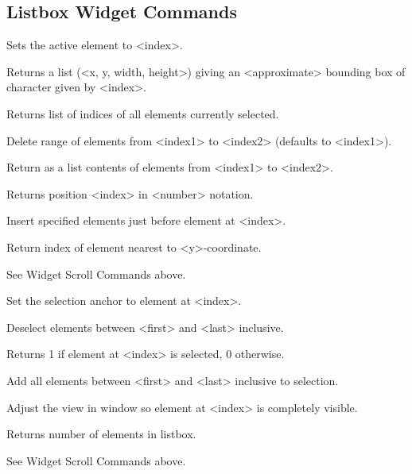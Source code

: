 \subsection*{Listbox Widget Commands}
\begin{enum}{1cm}

Sets the active element to <index>.

Returns a list (<x, y, width, height>) giving an <approximate> 
bounding box of character given by <index>.

Returns list of indices of all elements currently selected.

Delete range of elements from <index1> to <index2> (defaults to <index1>).

Return as a list contents of elements from <index1> to <index2>.

Returns position <index> in <number> notation.

Insert specified elements just before element at <index>.

Return index of element nearest to <y>-coordinate.

See Widget Scroll Commands above.

Set the selection anchor to element at <index>.

Deselect elements between <first> and <last> inclusive.

Returns 1 if element at <index> is selected, 0 otherwise.

Add all elements between <first> and <last> inclusive to selection.

Adjust the view in window so element at <index> is completely visible.

Returns number of elements in listbox.

See Widget Scroll Commands above.

\end{enum}

